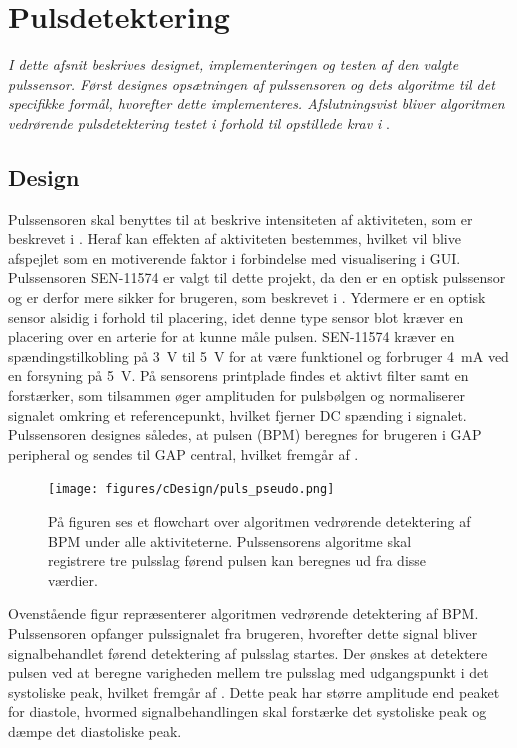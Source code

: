 \section{Pulsdetektering}\label{sec_de_im_te_puls}
\textit{I dette afsnit beskrives designet, implementeringen og testen af den valgte pulssensor. Først designes opsætningen af pulssensoren og dets algoritme til det specifikke formål, hvorefter dette implementeres. Afslutningsvist bliver algoritmen vedrørende pulsdetektering testet i forhold til opstillede krav i }.

\subsection{Design} \label{sec_design_puls}
Pulssensoren skal benyttes til at beskrive intensiteten af aktiviteten, som er beskrevet i . Heraf kan effekten af aktiviteten bestemmes, hvilket vil blive afspejlet som en motiverende faktor i forbindelse med visualisering i GUI. \newline
Pulssensoren SEN-11574 er valgt til dette projekt, da den er en optisk pulssensor og er derfor mere sikker for brugeren, som beskrevet i . Ydermere er en optisk sensor alsidig i forhold til placering, idet denne type sensor blot kræver en placering over en arterie for at kunne måle pulsen. SEN-11574 kræver en spændingstilkobling på 3~V til 5~V for at være funktionel og forbruger 4~mA ved en forsyning på 5~V. På sensorens printplade findes et aktivt filter samt en forstærker, som tilsammen øger amplituden for pulsbølgen og normaliserer signalet omkring et referencepunkt, hvilket fjerner DC spænding i signalet. \citep{Murphy2016,Murphy2016_sensor}\\
Pulssensoren designes således, at pulsen (BPM) beregnes for brugeren i GAP peripheral og sendes til GAP central, hvilket fremgår af .
\begin{figure}[H]
	\centering
	\texttt{[image: figures/cDesign/puls\_pseudo.png]}
	\caption{På figuren ses et flowchart over algoritmen vedrørende detektering af BPM under alle aktiviteterne. Pulssensorens algoritme skal registrere tre pulsslag førend pulsen kan beregnes ud fra disse værdier.}
	\label{fig:puls_pseudo}
\end{figure}
Ovenstående figur repræsenterer algoritmen vedrørende detektering af BPM. Pulssensoren opfanger pulssignalet fra brugeren, hvorefter dette signal bliver signalbehandlet førend detektering af pulsslag startes. Der ønskes at detektere pulsen ved at beregne varigheden mellem tre pulsslag med udgangspunkt i det systoliske peak, hvilket fremgår af . Dette peak har større amplitude end peaket for diastole, hvormed signalbehandlingen skal forstærke det systoliske peak og dæmpe det diastoliske peak.  \\
